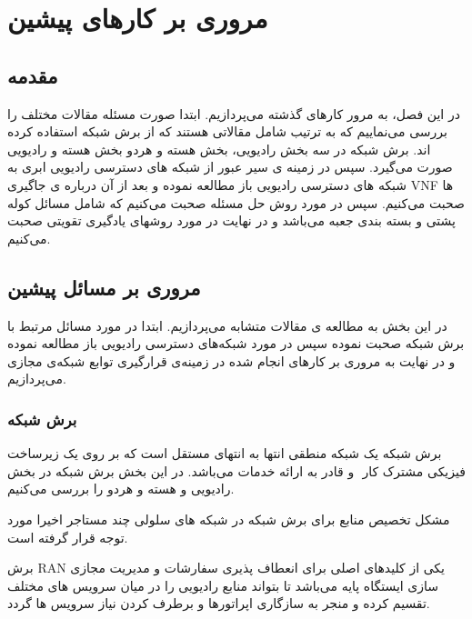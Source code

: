 \chapter{مروری بر کارهای پیشین}

\section{مقدمه}
در این فصل، به مرور کارهای گذشته می‌پردازیم.
ابتدا صورت مسئله مقالات مختلف را بررسی می‌نماییم که
 به ترتیب شامل مقالاتی هستند که از برش شبکه استفاده کرده اند.
برش شبکه در سه بخش رادیویی، بخش هسته و هردو بخش هسته و رادیویی صورت می‌گیرد.
سپس در زمینه ی سیر عبور از شبکه های دسترسی رادیویی ابری به شبکه های دسترسی رادیویی باز مطالعه نموده و بعد از آن درباره ی جاگیری VNF ها صحبت می‌کنیم.
سپس در مورد روش حل مسئله صحبت می‌کنیم که شامل مسائل کوله پشتی و بسته بندی جعبه می‌باشد و در نهایت در مورد روشهای یادگیری تقویتی صحبت می‌کنیم.
\section{مروری بر مسائل پیشین}
در این بخش به مطالعه ی مقالات متشابه می‌پردازیم. ‌‌‌ابتدا در مورد مسائل مرتبط با برش شبکه صحبت نموده سپس در مورد شبکه‌های دسترسی رادیویی باز مطالعه نموده و در نهایت به مروری بر کارهای انجام شده در زمینه‌ی قرارگیری توابع شبکه‌ی مجازی می‌پردازیم.
\subsection{برش شبکه}
برش شبکه یک شبکه منطقی انتها به انتهای مستقل است که بر روی یک زیرساخت فیزیکی مشترک کار ‌ و قادر به ارائه خدمات می‌باشد.
در این بخش برش شبکه در بخش رادیویی و هسته و هردو را بررسی می‌کنیم.

مشکل تخصیص منابع برای برش شبکه در شبکه های سلولی چند مستاجر اخیرا مورد توجه قرار گرفته است\cite{feng2020dynamic,lee2018dynamic,lee2016new}.

برش RAN یکی از کلیدهای اصلی برای انعطاف پذیری سفارشات و مدیریت مجازی سازی ایستگاه پایه می‌باشد تا بتواند منابع رادیویی را در میان سرویس های مختلف تقسیم کرده و منجر به سازگاری اپراتورها و برطرف کردن نیاز سرویس ها گردد.


